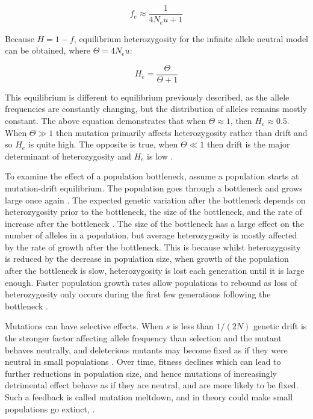 \begin{equation}
f_e \approx \frac{1}{4N_eu+1}
\end{equation}

Because $H = 1 - f$, equilibrium heterozygosity for the infinite allele neutral model can be obtained, where $\Theta = 4N_eu$:

\begin{equation}
H_e = \frac{\Theta}{\Theta + 1}
\end{equation}

This equilibrium is different to equilibrium previously described, as the allele frequencies are constantly changing, but the distribution of alleles remains mostly constant.
The above equation demonstrates that when $\Theta \approx 1$, then $H_e \approx 0.5$.
When $\Theta \gg 1$ then mutation primarily affects heterozygosity rather than drift and so $H_e$ is quite high.
The opposite is true, when $\Theta \ll 1$ then drift is the major determinant of heterozygosity and $H_e$ is low \parencite{Kimura1964,Hedrick2010}.

To examine the effect of a population bottleneck, assume a population starts at mutation-drift equilibrium. 
The population goes through a bottleneck and grows large once again \parencite{Nei2005}.
The expected genetic variation after the bottleneck depends on heterozygosity prior to the bottleneck, the size of the bottleneck, and the rate of increase after the bottleneck \parencite{Nei1975}.
The size of the bottleneck has a large effect on the number of alleles in a population, but average heterozygosity is mostly affected by the rate of growth after the bottleneck.
This is because whilst heterozygosity is reduced by the decrease in population size, when growth of the population after the bottleneck is slow, heterozygosity is lost each generation until it is large enough. 
Faster population growth rates allow populations to rebound as loss of heterozygosity only occurs during the first few generations following the bottleneck \parencite{Nei1975}.

Mutations can have selective effects.
When $s$ is less than $1/(2N)$ genetic drift is the stronger factor affecting allele frequency than selection and the mutant behaves neutrally, and deleterious mutants may become fixed as if they were neutral in small populations \parencite{Kimura1983,Lynch1990a,Lande1994}.
Over time, fitness declines which can lead to further reductions in population size, and hence mutations of increasingly detrimental effect behave as if they are neutral, and are more likely to be fixed.
Such a feedback is called mutation meltdown, and in theory could make small populations go extinct, \parencite{Lynch1995}.